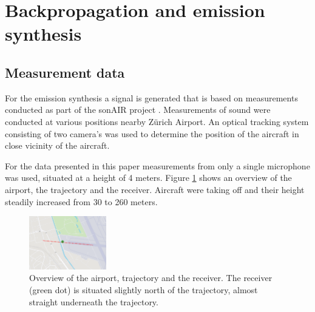 \section{Backpropagation and emission synthesis}

\subsection{Measurement data}
For the emission synthesis a signal is generated that is based on measurements
conducted as part of the sonAIR project \cite{Zellmann2013}. Measurements of
sound were conducted at various positions nearby Z\"{u}rich Airport. An
optical tracking system consisting of two camera's was used to determine the
position of the aircraft in close vicinity of the aircraft.

For the data presented in this paper measurements from only a single microphone
was used, situated at a height of 4 meters. Figure \ref{fig:figure_trajectory}
shows an overview of the airport, the trajectory and the receiver. Aircraft were
taking off and their height steadily increased from 30 to 260 meters.


\begin{figure}[H]
  \centering
  \includegraphics[width=0.3\textwidth]{../figures/manual/auralisation-paper/figure_trajectory}
  \caption{Overview of the airport, trajectory and the receiver. The receiver
(green dot) is situated slightly north of the trajectory, almost straight underneath the
trajectory.}
  \label{fig:figure_trajectory}
\end{figure}


